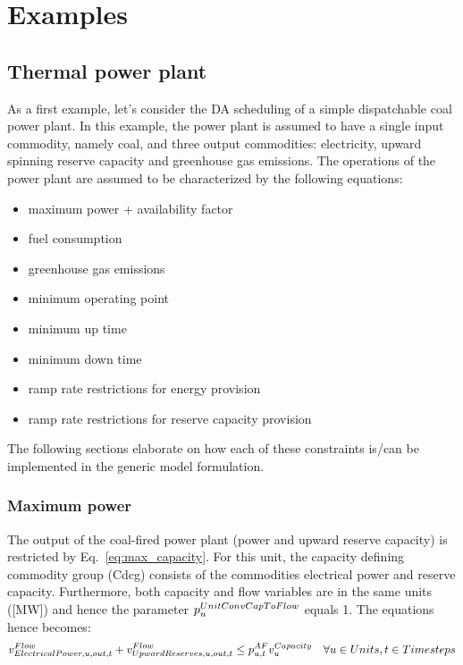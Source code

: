 

\clearpage
\section{Examples}

\subsection{Thermal power plant}
As a first example, let's consider the DA scheduling of a simple dispatchable coal power plant. In this example, the power plant is assumed to have a single input commodity, namely coal, and three output commodities: electricity, upward spinning reserve capacity and greenhouse gas emissions. The operations of the power plant are assumed to be characterized by the following equations:
\begin{itemize}
\item maximum power + availability factor 
\item fuel consumption
\item greenhouse gas emissions
\item minimum operating point
\item minimum up time
\item minimum down time
\item ramp rate restrictions for energy provision
\item ramp rate restrictions for reserve capacity provision
\end{itemize}

The following sections elaborate on how each of these constraints is/can be implemented in the generic model formulation.

\subsubsection{Maximum power}
The output of the coal-fired power plant (power and upward reserve capacity) is restricted by Eq.~\eqref{eq:max_capacity}. For this unit, the capacity defining commodity group (Cdcg) consists of the commodities electrical power and reserve capacity. Furthermore, both capacity and flow variables are in the same units ([MW]) and hence the parameter $\pUnitConvCapToFlow$ equals 1. The equations hence becomes:
\begin{align}
\vFlow[ElectricalPower,u,out,t] + \vFlow[UpwardReserves,u,out,t] \le \pAF \vCapacity \quad \forall \units, \timesteps \nonumber
\end{align}

